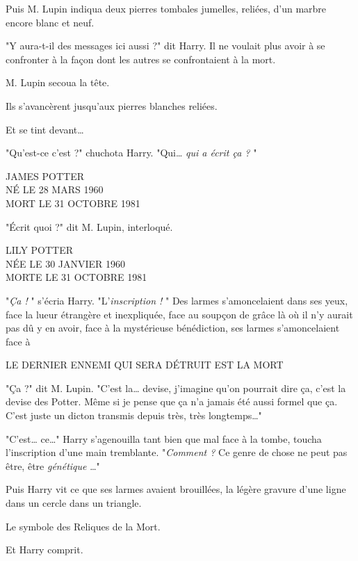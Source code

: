 Puis M. Lupin indiqua deux pierres tombales jumelles, reliées, d'un marbre encore blanc et neuf.

"Y aura-t-il des messages ici aussi ?" dit Harry. Il ne voulait plus avoir à se confronter à la façon dont les autres se confrontaient à la mort.

M. Lupin secoua la tête.

Ils s'avancèrent jusqu'aux pierres blanches reliées.

Et se tint devant…

"Qu'est-ce c'est ?" chuchota Harry. "Qui… \emph{qui a écrit ça ?} "


\begin{center}JAMES POTTER\\NÉ LE 28 MARS 1960\\MORT LE 31 OCTOBRE 1981\end{center}


"Écrit quoi ?" dit M. Lupin, interloqué.


\begin{center}LILY POTTER\\NÉE LE 30 JANVIER 1960\\MORTE LE 31 OCTOBRE 1981\end{center}


"\emph{Ça !} " s'écria Harry. "L'\emph{inscription !} " Des larmes s'amoncelaient dans ses yeux, face la lueur étrangère et inexpliquée, face au soupçon de grâce là où il n'y aurait pas dû y en avoir, face à la mystérieuse bénédiction, ses larmes s'amoncelaient face à


\begin{center}LE DERNIER ENNEMI QUI SERA DÉTRUIT EST LA MORT\end{center}


"Ça ?" dit M. Lupin. "C'est la… devise, j'imagine qu'on pourrait dire ça, c'est la devise des Potter. Même si je pense que ça n'a jamais été aussi formel que ça. C'est juste un dicton transmis depuis très, très longtemps…"

"C'est… ce…" Harry s'agenouilla tant bien que mal face à la tombe, toucha l'inscription d'une main tremblante. "\emph{Comment ?}  Ce genre de chose ne peut pas être, être \emph{génétique} …"

Puis Harry vit ce que ses larmes avaient brouillées, la légère gravure d'une ligne dans un cercle dans un triangle.

Le symbole des Reliques de la Mort.

Et Harry comprit.

